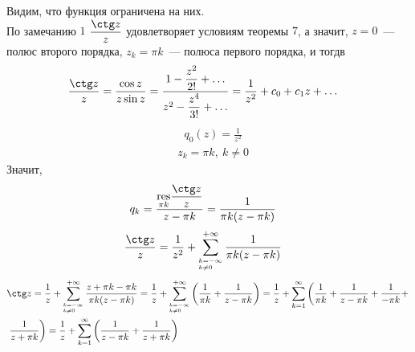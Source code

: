Видим, что функция ограничена на них.
\\
По замечанию $1$ $\dst \frac{\ctg z}{z}$ удовлетворяет условиям теоремы $7$, а
значит, $z = 0$~--- полюс второго порядка, $z_k = \pi k$~--- полюса первого
порядка, и тогдв
\begin{align*}
  & \frac{\ctg z}{z} = \frac{\cos z}{z \sin z} = \frac{1 - \dst \frac{z^2}{2!} +\dots}{z^2 - \dst \frac{z^4}{3!}+\dots} = \frac{1}{z^2} +c_0 + c_1z + \dots
\end{align*}
\begin{align*}
  & q_0(z) = \frac{1}{z^2}
\end{align*}
\begin{align*}
  & z_k = \pi k, \ k \neq 0
\end{align*}
Значит,
\begin{align*}
  &  q_k = \frac{\us{\pi k}{\res}\dst \frac{\ctg z}{z}}{z - \pi k} = \frac{1}{\pi k (z - \pi k)}
\end{align*}
\begin{align*}
  & \frac{\ctg z}{z} = \frac{1}{z^2} +\sum_{^{k=-\infty}_{k \neq 0}}^{+\infty}\frac{1}{\pi k (z-\pi k)}
\end{align*}
\begin{align*}
  & \ctg z = \frac{1}{z} +\sum_{^{k=-\infty}_{k \neq 0}}^{+\infty}\frac{z+\pi k -\pi k}{\pi k (z-\pi k)} = \frac{1}{z} +\sum_{^{k=-\infty}_{k \neq 0}}^{+\infty}\left( \frac{1}{\pi k} + \frac{1}{z-\pi k}\right) = \frac{1}{z} +\sum_{k=1}^{\infty}\left( \frac{1}{\pi k} + \frac{1}{z-\pi k} + \frac{1}{-\pi k} + \right. \\
  &\left. \frac{1}{z+\pi k}\right) = \frac{1}{z} +\sum_{k=1}^{\infty}\left( \frac{1}{z-\pi k} + \frac{1}{z+\pi k}\right)
\end{align*}
